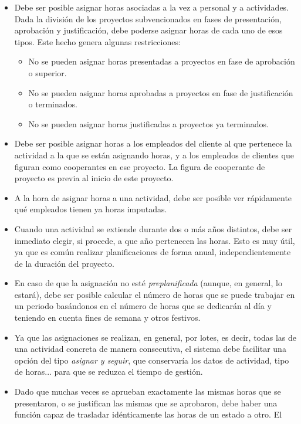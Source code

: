 \begin{itemize}
 \item Debe ser posible asignar horas asociadas a la vez a personal y a
actividades. Dada la división de los proyectos subvencionados en fases de
presentación, aprobación y justificación, debe poderse asignar horas de cada
uno de esos tipos. Este hecho genera algunas restricciones:
 \begin{itemize}
  \item No se pueden asignar horas presentadas a proyectos en fase de
aprobación o superior.
  \item No se pueden asignar horas aprobadas a proyectos en fase de
justificación o terminados.
  \item No se pueden asignar horas justificadas a proyectos ya terminados.
 \end{itemize}
 \item Debe ser posible asignar horas a los empleados del cliente al que
pertenece la actividad a la que se están asignando horas, y a los empleados de
clientes que figuran como cooperantes en ese proyecto. La figura de cooperante
de proyecto es previa al inicio de este proyecto.
 \item A la hora de asignar horas a una actividad, debe ser posible ver
rápidamente qué empleados tienen ya horas imputadas.
 \item Cuando una actividad se extiende durante dos o más años distintos, debe
ser inmediato elegir, si procede, a que año pertenecen las horas. Esto es muy
útil, ya que es común realizar planificaciones de forma anual,
independientemente de la duración del proyecto.
 \item En caso de que la asignación no esté \textit{preplanificada} (aunque,
en general, lo estará), debe ser posible calcular el número de horas que se
puede trabajar en un periodo basándonos en el número de horas que se dedicarán
al día y teniendo en cuenta fines de semana y otros festivos.
 \item Ya que las asignaciones se realizan, en general, por lotes, es decir,
todas las de una actividad concreta de manera consecutiva, el sistema debe
facilitar una opción del tipo \textit{asignar y seguir}, que conservaría los
datos de actividad, tipo de horas... para que se reduzca el tiempo de gestión.
 \item Dado que muchas veces se aprueban exactamente las mismas horas que se
presentaron, o se justifican las mismas que se aprobaron, debe haber una
función capaz de trasladar idénticamente las horas de un estado a otro. El

\end{itemize}

